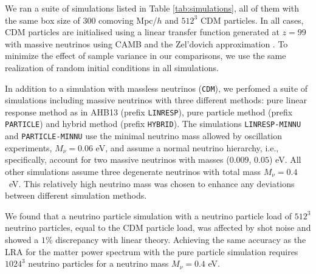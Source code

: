 \documentclass[useAMS, usenatbib]{mnras}
\begin{document}
We ran a suite of simulations listed in Table \ref{tab:simulations}, all of them with the same box size of $300$ comoving Mpc/$h$ and $512^3$ CDM particles. In all cases, CDM particles are initialised using a linear transfer function generated at $z=99$ with massive neutrinos using CAMB \citep{CAMB_neutrinos} and the Zel'dovich approximation \citep{Zeldovich_1970}. To minimize the effect of sample variance in our comparisons, we use the same realization of random initial conditions in all simulations.

In addition to a simulation with massless neutrinos (\texttt{CDM}), we perfomed a suite of simulations including massive neutrinos with three different methods: pure linear response method as in AHB13 (prefix \texttt{LINRESP}), pure particle method (prefix \texttt{PARTICLE}) and hybrid method (prefix \texttt{HYBRID}). The simulations \texttt{LINRESP-MINNU} and \texttt{PARTICLE-MINNU} use the minimal neutrino mass allowed by oscillation experiments, $M_\nu = 0.06$ eV, and assume a normal neutrino hierarchy, i.e., specifically, account for two massive neutrinos with masses ($0.009$, $0.05$) eV. All other simulations assume three degenerate neutrinos with total mass $M_\nu = 0.4$~eV. This relatively high neutrino mass was chosen to enhance any deviations between different simulation methods.

We found that a neutrino particle simulation with a neutrino particle load of $512^3$ neutrino particles, equal to the CDM particle load, was affected by shot noise and showed a $1\%$ discrepancy with linear theory. Achieving the same accuracy as the LRA for the matter power spectrum with the pure particle simulation requires $1024^3$ neutrino particles for a neutrino mass $M_\nu = 0.4$ eV.

\end{document}
